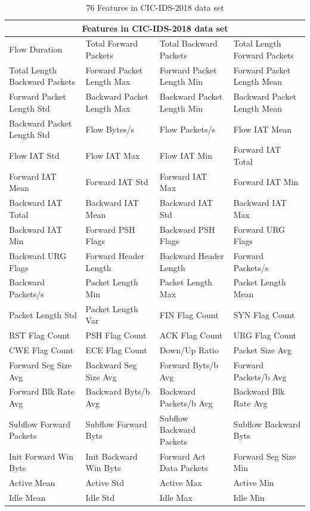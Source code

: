 \documentclass{ieeeaccess}
\theoremstyle{definition}
\begin{document}
\begin{table}[!htpb]
    \caption{76 Features in CIC-IDS-2018 data set}
    \label{tab:features}
    \centering
    \begin{tabular}{llll}
    \toprule
    \multicolumn{4}{c}{Features in CIC-IDS-2018 data set} \\
    \midrule
    Flow Duration & Total Forward Packets & Total Backward Packets & Total Length Forward Packets \\
    Total Length Backward Packets & Forward Packet Length Max & Forward Packet Length Min & Forward Packet Length Mean \\
    Forward Packet Length Std & Backward Packet Length Max & Backward Packet Length Min & Backward Packet Length Mean \\
    Backward Packet Length Std & Flow Bytes/s & Flow Packets/s & Flow IAT Mean \\
    Flow IAT Std & Flow IAT Max & Flow IAT Min & Forward IAT Total \\
    Forward IAT Mean & Forward IAT Std & Forward IAT Max & Forward IAT Min \\
    Backward IAT Total & Backward IAT Mean & Backward IAT Std & Backward IAT Max \\
    Backward IAT Min & Forward PSH Flags & Backward PSH Flags & Forward URG Flags \\
    Backward URG Flags & Forward Header Length & Backward Header Length & Forward Packets/s \\
    Backward Packets/s & Packet Length Min & Packet Length Max & Packet Length Mean \\
    Packet Length Std &  Packet Length Var & FIN Flag Count & SYN Flag Count \\
    RST Flag Count & PSH Flag Count & ACK Flag Count & URG Flag Count \\
    CWE Flag Count & ECE Flag Count & Down/Up Ratio & Packet Size Avg \\
    Forward Seg Size Avg & Backward Seg Size Avg & Forward Byts/b Avg & Forward Packets/b Avg \\
    Forward Blk Rate Avg & Backward Byts/b Avg & Backward Packets/b Avg & Backward Blk Rate Avg \\
    Subflow Forward Packets & Subflow Forward Byts & Subflow Backward Packets & Subflow Backward Byts \\
    Init Forward Win Byts &  Init Backward Win Byts &   Forward Act Data Packets & Forward Seg Size Min \\
    Active Mean & Active Std & Active Max & Active Min \\
    Idle Mean & Idle Std & Idle Max & Idle Min \\
    \bottomrule
    \end{tabular}
\end{table}
\end{document}
